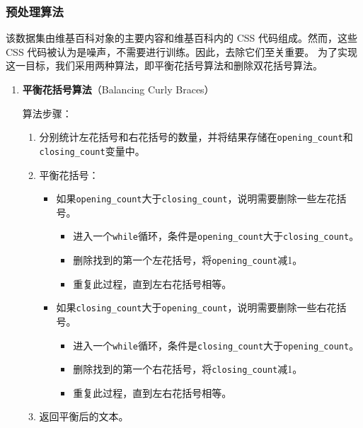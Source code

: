 \documentclass[
]{article}
\begin{document}
\subsubsection{预处理算法}\label{ux9884ux5904ux7406ux7b97ux6cd5}

该数据集由维基百科对象的主要内容和维基百科内的 CSS 代码组成。然而，这些
CSS 代码被认为是噪声，不需要进行训练。因此，去除它们至关重要。
为了实现这一目标，我们采用两种算法，即平衡花括号算法和删除双花括号算法。

\begin{enumerate}
  \def\labelenumi{\arabic{enumi}.}
  \item
        \textbf{平衡花括号算法}（Balancing Curly Braces）

        算法步骤：

        \begin{enumerate}
          \def\labelenumii{\arabic{enumii}.}
          \item
                分别统计左花括号和右花括号的数量，并将结果存储在\texttt{opening\_count}和\texttt{closing\_count}变量中。
          \item
                平衡花括号：

                \begin{itemize}
                  \item
                        如果\texttt{opening\_count}大于\texttt{closing\_count}，说明需要删除一些左花括号。

                        \begin{itemize}
                          \item
                                进入一个\texttt{while}循环，条件是\texttt{opening\_count}大于\texttt{closing\_count}。
                          \item
                                删除找到的第一个左花括号，将\texttt{opening\_count}减1。
                          \item
                                重复此过程，直到左右花括号相等。
                        \end{itemize}
                  \item
                        如果\texttt{closing\_count}大于\texttt{opening\_count}，说明需要删除一些右花括号。

                        \begin{itemize}
                          \item
                                进入一个\texttt{while}循环，条件是\texttt{closing\_count}大于\texttt{opening\_count}。
                          \item
                                删除找到的第一个右花括号，将\texttt{closing\_count}减1。
                          \item
                                重复此过程，直到左右花括号相等。
                        \end{itemize}
                \end{itemize}
          \item
                返回平衡后的文本。
        \end{enumerate}


\end{enumerate}
\end{document}
